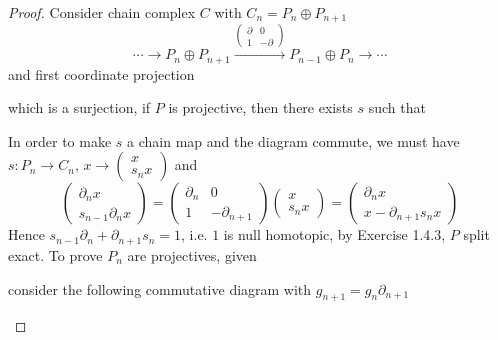 \documentclass{article}
\theoremstyle{definition}
\theoremstyle{remark}
\theoremstyle{definition}
\begin{document}
\begin{proof}
Consider chain complex $C$ with $C_n=P_n\oplus P_{n+1}$
\[\cdots\to P_n\oplus P_{n+1}\xrightarrow{\begin{pmatrix}
\partial&0 \\
1&-\partial
\end{pmatrix}}P_{n-1}\oplus P_n\to\cdots\]
and first coordinate projection  which is a surjection, if $P$ is projective, then there exists $s$ such that
\begin{center}
\end{center}
In order to make $s$ a chain map and the diagram commute, we must have $s:P_n\to C_n$, $x\to\begin{pmatrix}
x \\
s_nx
\end{pmatrix}$ and
\[\begin{pmatrix}
\partial_nx \\
s_{n-1}\partial_nx
\end{pmatrix}=\begin{pmatrix}
\partial_n&0 \\
1&-\partial_{n+1}
\end{pmatrix}\begin{pmatrix}
x \\
s_nx
\end{pmatrix}=\begin{pmatrix}
\partial_n x \\
x-\partial_{n+1}s_nx
\end{pmatrix}\]
Hence $s_{n-1}\partial_n+\partial_{n+1}s_n=1$, i.e. $1$ is null homotopic, by Exercise 1.4.3, $P$ split exact.
To prove $P_n$ are projectives, given
\begin{center}
\end{center}
consider the following commutative diagram with $g_{n+1}=g_n\partial_{n+1}$
\begin{center}

\end{center}
\end{proof}
\end{document}
